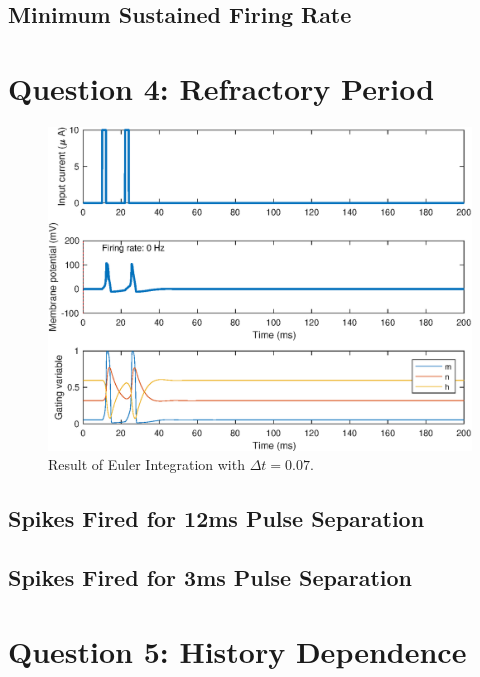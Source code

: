 \documentclass[11pt, oneside]{article}
\begin{document}
\subsection{Minimum Sustained Firing Rate}

\section{Question 4: Refractory Period}

\begin{figure}[ht!]
\centering
\includegraphics[width=1\textwidth]{simulate_hh_dt_7.eps}
\caption{Result of Euler Integration with $\Delta t = 0.07$.}
\label{fig:euler_integration_seven}
\end{figure}

\subsection{Spikes Fired for 12ms Pulse Separation}

\subsection{Spikes Fired for 3ms Pulse Separation}

\section{Question 5: History Dependence}
\end{document}
